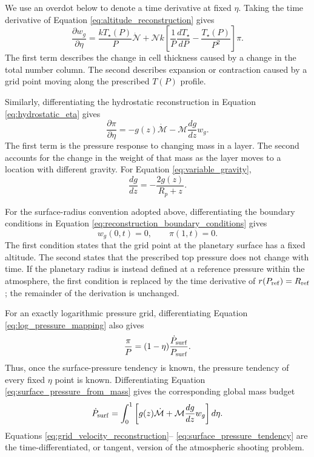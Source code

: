 \documentclass[twocolumn]{aastex631}
\begin{document}
We use an overdot below to denote a time derivative at fixed $\eta$. Taking
the time derivative of Equation \eqref{eq:altitude_reconstruction} gives
\begin{equation}
  \frac{\partial w_g}{\partial\eta}
  =
  \frac{kT_\star(P)}{P}\dot{\mathcal{N}}
  +\mathcal{N}k
  \left[
    \frac{1}{P}\frac{dT_\star}{dP}
    -\frac{T_\star(P)}{P^2}
  \right]\pi .
  \label{eq:grid_velocity_reconstruction}
\end{equation}
The first term describes the change in cell thickness caused by a change in
the total number column. The second describes expansion or contraction caused
by a grid point moving along the prescribed $T(P)$ profile.

Similarly, differentiating the hydrostatic reconstruction in Equation
\eqref{eq:hydrostatic_eta} gives
\begin{equation}
  \frac{\partial\pi}{\partial\eta}
  =
  -g(z)\dot{\mathcal{M}}
  -\mathcal{M}\frac{dg}{dz}w_g .
  \label{eq:pressure_tendency_reconstruction}
\end{equation}
The first term is the pressure response to changing mass in a layer. The
second accounts for the change in the weight of that mass as the layer moves
to a location with different gravity. For Equation
\eqref{eq:variable_gravity},
\begin{equation}
  \frac{dg}{dz}=-\frac{2g(z)}{R_p+z}.
  \label{eq:gravity_altitude_derivative}
\end{equation}

For the surface-radius convention adopted above, differentiating the boundary
conditions in Equation \eqref{eq:reconstruction_boundary_conditions} gives
\begin{equation}
  w_g(0,t)=0,
  \qquad
  \pi(1,t)=0.
  \label{eq:grid_velocity_boundary_conditions}
\end{equation}
The first condition states that the grid point at the planetary surface has a
fixed altitude. The second states that the prescribed top pressure does not
change with time. If the planetary radius is instead defined at a reference
pressure within the atmosphere, the first condition is replaced by the time
derivative of $r(P_{\rm ref})=R_{\rm ref}$; the remainder of the derivation is
unchanged.

For an exactly logarithmic pressure grid, differentiating Equation
\eqref{eq:log_pressure_mapping} also gives
\begin{equation}
  \frac{\pi}{P}
  =
  (1-\eta)\frac{\dot{P}_{\rm surf}}{P_{\rm surf}}.
  \label{eq:log_pressure_tendency}
\end{equation}
Thus, once the surface-pressure tendency is known, the pressure tendency of
every fixed $\eta$ point is known. Differentiating Equation
\eqref{eq:surface_pressure_from_mass} gives the corresponding global mass
budget
\begin{equation}
  \dot{P}_{\rm surf}
  =
  \int_0^1
  \left[
    g(z)\dot{\mathcal{M}}
    +\mathcal{M}\frac{dg}{dz}w_g
  \right]d\eta .
  \label{eq:surface_pressure_tendency}
\end{equation}
Equations \eqref{eq:grid_velocity_reconstruction}--
\eqref{eq:surface_pressure_tendency} are the time-differentiated, or tangent,
version of the atmospheric shooting problem.
\end{document}
